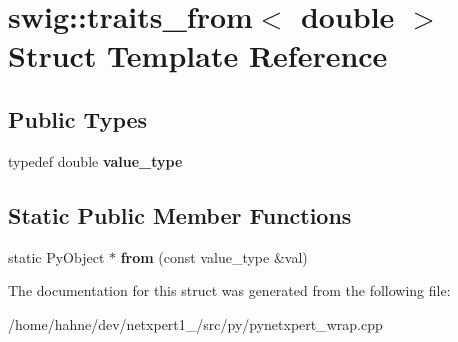 \hypertarget{structswig_1_1traits__from_3_01double_01_4}{}\section{swig\+:\+:traits\+\_\+from$<$ double $>$ Struct Template Reference}
\label{structswig_1_1traits__from_3_01double_01_4}
\subsection*{Public Types}
\begin{DoxyCompactItemize}
\item 
typedef double {\bfseries value\+\_\+type}\hypertarget{structswig_1_1traits__from_3_01double_01_4_a91858e8bb1587ef10fc2c5e277abcc33}{}\label{structswig_1_1traits__from_3_01double_01_4_a91858e8bb1587ef10fc2c5e277abcc33}

\end{DoxyCompactItemize}
\subsection*{Static Public Member Functions}
\begin{DoxyCompactItemize}
\item 
static Py\+Object $\ast$ {\bfseries from} (const value\+\_\+type \&val)\hypertarget{structswig_1_1traits__from_3_01double_01_4_ae561b4392eb983662f203737585c2241}{}\label{structswig_1_1traits__from_3_01double_01_4_ae561b4392eb983662f203737585c2241}

\end{DoxyCompactItemize}


The documentation for this struct was generated from the following file\+:\begin{DoxyCompactItemize}
\item 
/home/hahne/dev/netxpert1\+\_/src/py/pynetxpert\+\_\+wrap.\+cpp\end{DoxyCompactItemize}
